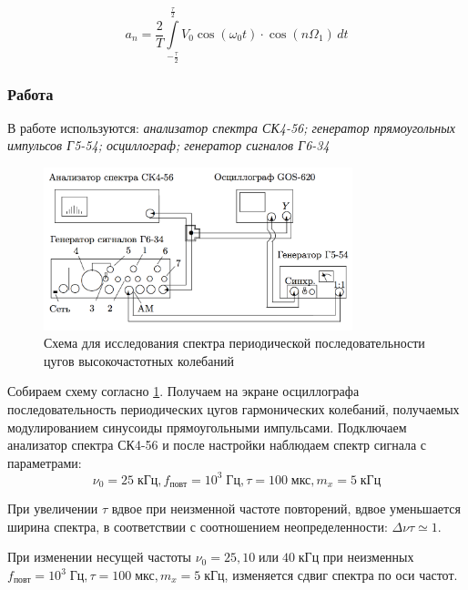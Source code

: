 \documentclass[a4paper, 12pt]{article}
\begin{document}
\begin{equation}
\label{form:cug_a_n}
a_n = \frac{2}{T}\int\limits_{ -\frac{\tau}{2} } ^ {\frac{\tau}{2} } V_0\cos(\omega_0t)\cdot \cos(n\Omega_1)\, dt
\end{equation}

\subsubsection*{Работа}

В работе используются: \textit{анализатор спектра СК4-56; генератор прямоугольных импульсов Г5-54; осциллограф; генератор сигналов Г6-34}

\begin{figure}[H]
\centering
\includegraphics[width = 0.8\textwidth]{schemeB}
\caption{Схема для исследования спектра периодической последовательности цугов высокочастотных колебаний}
\label{img:scheme B}
\end{figure}

Собираем схему согласно \ref{img:scheme B}. Получаем на экране осциллографа последовательность периодических цугов гармонических колебаний, получаемых модулированием синусоиды прямоугольными импульсами. Подключаем анализатор спектра СК4-56 и после настройки наблюдаем спектр сигнала с параметрами: $$ \nu_0 = 25 \; \text{кГц}, f_\text{повт} = 10^3 \; \text{Гц}, \tau = 100 \; \text{мкс}, m_x = 5 \; \text{кГц}$$

При увеличении $\tau$ вдвое при неизменной частоте повторений, вдвое уменьшается ширина спектра, в соответствии с соотношением неопределенности: $\Delta \nu \tau \simeq 1$.

При изменении несущей частоты  $\nu_0 = 25, 10 \; \text{или} \; 40\; \text{кГц}$ при неизменных $f_\text{повт} = 10^3 \; \text{Гц}, \tau = 100 \; \text{мкс}, m_x = 5 \; \text{кГц}$, изменяется сдвиг спектра по оси частот.
\end{document}
